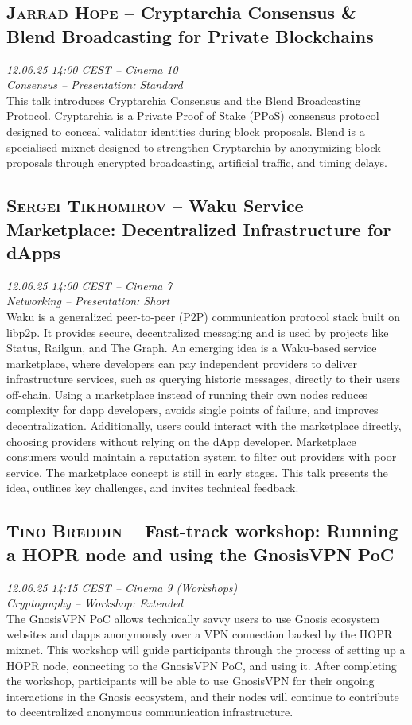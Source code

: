 \clearpage
\subsection {\textsc{Jarrad Hope}  -- Cryptarchia Consensus & Blend Broadcasting for Private Blockchains} \noindent \textit {12.06.25 14:00 CEST -- Cinema 10\\ Consensus -- Presentation: Standard}\\[1em] This talk introduces Cryptarchia Consensus and the Blend Broadcasting Protocol. Cryptarchia is a Private Proof of Stake (PPoS) consensus protocol designed to conceal validator identities during block proposals. Blend is a specialised mixnet designed to strengthen Cryptarchia by anonymizing block proposals through encrypted broadcasting, artificial traffic, and timing delays.

\clearpage
\subsection {\textsc{Sergei Tikhomirov}  -- Waku Service Marketplace: Decentralized Infrastructure for dApps} \noindent \textit {12.06.25 14:00 CEST -- Cinema 7\\ Networking -- Presentation: Short}\\[1em] Waku is a generalized peer-to-peer (P2P) communication protocol stack built on libp2p. It provides secure, decentralized messaging and is used by projects like Status, Railgun, and The Graph. An emerging idea is a Waku-based service marketplace, where developers can pay independent providers to deliver infrastructure services, such as querying historic messages, directly to their users off-chain. Using a marketplace instead of running their own nodes reduces complexity for dapp developers, avoids single points of failure, and improves decentralization. Additionally, users could interact with the marketplace directly, choosing providers without relying on the dApp developer. Marketplace consumers would maintain a reputation system to filter out providers with poor service. The marketplace concept is still in early stages. This talk presents the idea, outlines key challenges, and invites technical feedback.

\clearpage
\subsection {\textsc{Tino Breddin}  -- Fast-track workshop: Running a HOPR node and using the GnosisVPN PoC} \noindent \textit {12.06.25 14:15 CEST -- Cinema 9 (Workshops)\\ Cryptography -- Workshop: Extended}\\[1em] The GnosisVPN PoC allows technically savvy users to use Gnosis ecosystem websites and dapps anonymously over a VPN connection backed by the HOPR mixnet. This workshop will guide participants through the process of setting up a HOPR node, connecting to the GnosisVPN PoC, and using it. After completing the workshop, participants will be able to use GnosisVPN for their ongoing interactions in the Gnosis ecosystem, and their nodes will continue to contribute to decentralized anonymous communication infrastructure.

